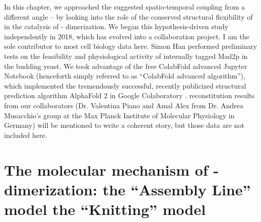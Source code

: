 In this chapter, we approached the suggested spatio-temporal coupling from a different angle -- by looking into the role of the conserved structural flexibility of  in the catalysis of - dimerization. We began this hypothesis-driven study independently in 2018, which has evolved into a collaboration project. I am the sole contributor to most cell biology data here. Simon Han performed preliminary tests on the feasibility and physiological activity of internally tagged Mad2p in the budding yeast. We took advantage of the free ColabFold advanced Jupyter Notebook (henceforth simply referred to as ``ColabFold advanced algorithm''), which implemented the tremendously successful, recently publicized structural prediction algorithm AlphaFold 2 in Google Colaboratory \cite{ColabFold, AlphaFold}.  reconstitution results from our collaborators (Dr. Valentina Piano and Amal Alex from Dr. Andrea Musacchio's group at the Max Planck Institute of Molecular Physiology in Germany) will be mentioned to write a coherent story, but those data are not included here.

\section{The molecular mechanism of - dimerization: the ``Assembly Line'' model  the ``Knitting'' model}
\label{TwoModels}

